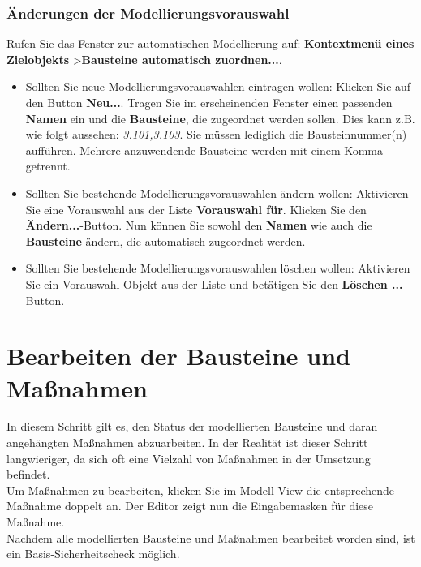 \documentclass[a4paper,10pt]{book}
\begin{document}
\subsubsection{Änderungen der Modellierungsvorauswahl}
Rufen Sie das Fenster zur automatischen Modellierung auf: \textbf{Kontextmenü eines Zielobjekts} \textgreater \textbf{Bausteine automatisch zuordnen...}.
\begin{itemize}
 \item Sollten Sie neue Modellierungsvorauswahlen eintragen wollen: Klicken Sie auf den Button \textbf{Neu...}. Tragen Sie im erscheinenden Fenster einen passenden \textbf{Namen} ein und die \textbf{Bausteine}, die zugeordnet werden sollen. Dies kann z.B. wie folgt aussehen: \textit{3.101,3.103}. Sie müssen lediglich die Bausteinnummer(n) aufführen. Mehrere anzuwendende Bausteine werden mit einem Komma getrennt.
 \item Sollten Sie bestehende Modellierungsvorauswahlen ändern wollen: Aktivieren Sie eine Vorauswahl aus der Liste \textbf{Vorauswahl für}. Klicken Sie den \textbf{Ändern...}-Button. Nun können Sie sowohl den \textbf{Namen} wie auch die \textbf{Bausteine} ändern, die automatisch zugeordnet werden.
 \item Sollten Sie bestehende Modellierungsvorauswahlen löschen wollen: Aktivieren Sie ein Vorauswahl-Objekt aus der Liste und betätigen Sie den \textbf{Löschen ...}-Button.
\end{itemize}

\section{Bearbeiten der Bausteine und Maßnahmen}
In diesem Schritt gilt es, den Status der modellierten Bausteine und daran angehängten Maßnahmen abzuarbeiten. In der Realität ist
dieser Schritt langwieriger, da sich oft eine Vielzahl von Maßnahmen in der Umsetzung befindet.
\newline\\
Um Maßnahmen zu bearbeiten, klicken Sie im Modell-View die entsprechende Maßnahme doppelt an. Der Editor zeigt nun die Eingabemasken für diese Maßnahme.
\newline\\
Nachdem alle modellierten Bausteine und Maßnahmen bearbeitet worden sind, ist ein Basis-Sicherheitscheck möglich.
\end{document}
